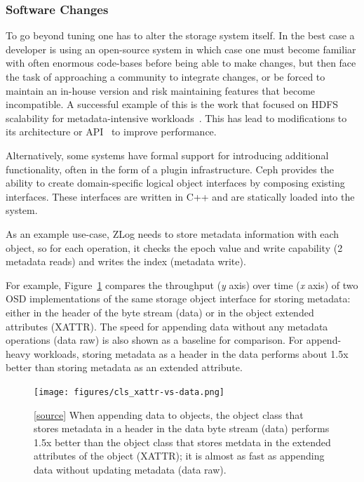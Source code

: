 \documentclass[10pt,twocolumn]{article}
\begin{document}
\subsubsection{Software Changes}\label{software-changes}

To go beyond tuning one has to alter the storage system
itself. In the best case a developer is using an open-source system in which
case one must become familiar with often enormous code-bases before being able
to make changes, but then face the task of approaching a community to
integrate changes, or be forced to maintain an in-house version and risk
maintaining features that become incompatible.  A successful example of this
is the work that focused on HDFS scalability for metadata-intensive workloads~\cite{shvachko_hdfs_2010}. This has lead to modifications to its
architecture or API~\cite{balmin:sigmod2012-clydesdale} to improve
performance.

Alternatively, some systems have formal support for introducing additional
functionality, often in the form of a plugin infrastructure. Ceph provides the
ability to create domain-specific logical object interfaces by composing
existing interfaces. These interfaces are written in C++ and are statically
loaded into the system. %

As an example use-case, ZLog needs to
store metadata information with each object, so for each operation, it
checks the epoch value and write capability (2 metadata reads) and
writes the index (metadata write).
\fi

For example, Figure~\ref{fig:datavsxattr} compares the throughput
(\emph{y} axis) over time (\emph{x} axis) of two OSD implementations of the same storage object interface for
storing metadata: either in the header of the byte stream (data) or in the
object extended attributes (XATTR). The speed for appending data without
any metadata operations (data raw) is also shown as a baseline for
comparison. For append-heavy workloads, storing metadata as a header in
the data performs about 1.5x better than storing metadata as an extended
attribute.

\begin{figure}[htbp]
\centering
\texttt{[image: figures/cls\_xattr-vs-data.png]}
\caption{{[}\href{https://github.com/michaelsevilla/malacology-popper/blob/master/experiments/figure1/visualize.ipynb}{source}{]}
When appending data to objects, the object class that stores metadata in
a header in the data byte stream (data) performs 1.5x better than the
object class that stores metdata in the extended attributes of the
object (XATTR); it is almost as fast as appending data without updating
metadata (data raw).}
\label{fig:datavsxattr}
\end{figure}
\end{document}
